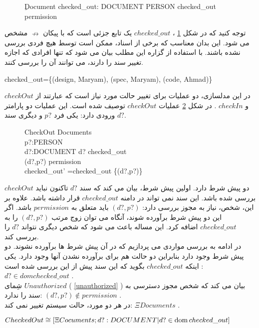  \begin{figure}
\centering
\begin{schema}{ِDocument}
checked\_out: DOCUMENT \nrightarrow PERSON
\ST
checked\_out \subseteq permission
\end{schema}
\caption{}
\label{Document}
\end{figure}
توجه کنید که در شکل
\ref{Document}
، 
$checked\_out$
یک تابع جزئی است که با پیکان 
$\nrightarrow$
مشخص می شود. این بدان معناسب که برخی از اسناد، ممکن است توسط هیچ فردی بررسی نشده باشند. با استفاده از گزاره این مطلب بیان می شود که تنها افرادی که اجازه تغییر سند را دارند، می توانند آن را بررسی کنند.
\begin{LTR}
checked\_out=\{(design, Maryam), (spec, Maryam), (code, Ahmad)\}
\end{LTR} 
در این مدلسازی، دو عملیات برای تغییر حالت مورد نیاز است
 که عبارتند از
$checkOut$
و
$checkIn$
. 
در شکل
\ref{checkout}
عملیات 
$checkOut$
 توصیف شده است. این عملیات دو پارامتر ورودی دارد: یکی فرد $p?$ و دیگری سند $d?$.

\begin{figure}
\centering
\begin{schema}{CheckOut}
\Delta Documents\\
p?:PERSON\\
d?:DOCUMENT
\ST
d? \notin \dom checked\_out\\
(d?,p?) \in permission\\
checked\_out' =checked\_out \cup \{(d?,p?)\}
\end{schema}
\caption{}
\label{checkout}
\end{figure}
$checkOut$ 
دو پیش شرط دارد.
اولین پیش شرط، بیان می کند که سند $d?$ تاکنون نباید بررسی شده باشد. این سند نمی تواند در دامنه 
$checked\_out$
قرار داشته باشد. علاوه بر این، شخص، نیاز به مجوز بررسی دارد:
$(d?, p?)$
 باید متعلق به 
 $permission$ باشد.
 اگر این دو پیش شرط برآورده شوند، آنگاه می توان زوج مرتب 
 $(d?, p?)$
 را به 
 $checked\_out$
 اضافه کرد. این مساله باعث می شود که شخص دیگری نتواند $d?$ را بررسی کند.
 \\
در ادامه به بررسی مواردی می پردازیم که در آن پیش شرط ها برآورده نشوند. دو پیش شرط وجود دارد بنابراین دو حالت هم برای برآورده نشدن آنها وجود دارد. یکی اینکه 
$checked\_out$
بگوید که این سند پیش از این بررسی شده است :
$d? \in dom checked\_out$ 
. 
\\
شِمای 
$Unauthorized$
( \ref{unauthorized} )
بیان می کند که شخص مجوز دسترسی به سند را ندارد:
$(d?, p?) \notin permission$
. 
\\
 در هر دو مورد، حالت سیستم تغییر نمی کند:
$\Xi Documents$
.
\begin{LTR}
$CheckedOut \cong [ \Xi Cocuments; d?:DOCUMENT | d? \in \mathop{\mathstrut{\mbox{\textrm{dom}}}}\nolimits checked\_out]$
\end{LTR} 


